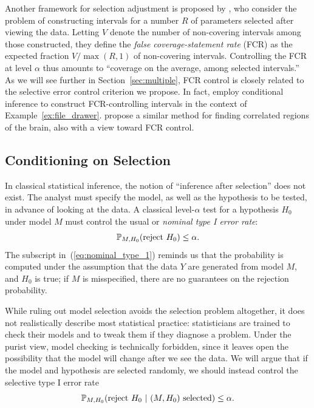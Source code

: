 \documentclass{article}
\theoremstyle{definition}
\begin{document}
Another framework for selection adjustment is proposed by \citet{benjamini2005false}, who consider the problem of constructing intervals for a number $R$ of parameters selected after viewing the data. Letting $V$ denote the number of non-covering intervals among those constructed, they define the {\em false coverage-statement rate} (FCR) as the expected fraction $V/\max(R,1)$ of non-covering intervals. Controlling the FCR at level $\alpha$ thus amounts to ``coverage on the average, among selected intervals.'' As we will see further in Section~\ref{sec:multiple}, FCR control is closely related to the selective error control criterion we propose. In fact, \citet{weinstein2013selection} employ conditional inference to construct FCR-controlling intervals in the context of Example~\ref{ex:file_drawer}. \citet{rosenblatt2014selective} propose a similar method for finding correlated regions of the brain, also with a view toward FCR control.

\subsection{Conditioning on Selection}\label{sec:conditioning}


In classical statistical inference, the notion of ``inference after selection'' does not exist. The analyst must specify the model, as well as the hypothesis to be tested, in advance of looking at the data. A classical level-$\alpha$ test for a hypothesis $H_0$ under model $M$ must control the usual or {\em nominal type I error rate}:
\begin{equation}
\P_{M, H_0}(\text{reject $H_0$}) \leq \alpha.
\label{eq:nominal_type_1}
\end{equation}
The subscript in~(\ref{eq:nominal_type_1}) reminds us that the probability is computed under the assumption that the data $Y$ are generated from model $M$, and $H_0$ is true; if $M$ is misspecified, there are no guarantees on the rejection probability.

While ruling out model selection avoids the selection problem altogether, it does not realistically describe most statistical practice: statisticians are trained to check their models and to tweak them if they diagnose a problem. Under the purist view, model checking is technically forbidden, since it leaves open the possibility that the model will change after we see the data. We will argue that if the model and hypothesis are selected randomly, we should instead control the selective type I error rate
\begin{equation}
\P_{M,H_0}( \text{reject $H_0$}\ |\ \text{$(M, H_0)$ selected} ) \leq \alpha.
\label{eq:selective_type_1}
\end{equation}
\end{document}
